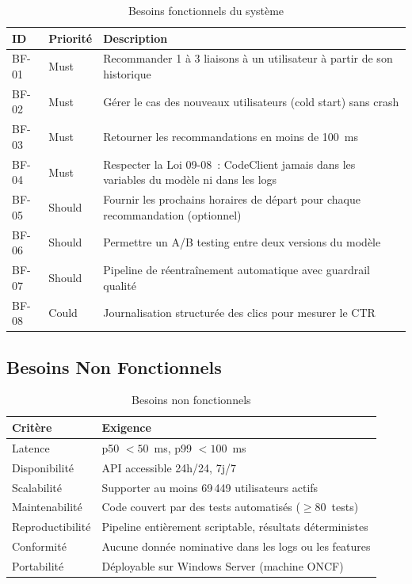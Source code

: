 \documentclass[12pt, a4paper]{report}
\begin{document}
\begin{table}[H]
\centering
\caption{Besoins fonctionnels du système}
\begin{tabularx}{\textwidth}{|l|l|X|}
\hline
\textbf{ID} & \textbf{Priorité} & \textbf{Description} \\
\hline
BF-01 & Must & Recommander 1 à 3 liaisons à un utilisateur à partir de son historique \\
\hline
BF-02 & Must & Gérer le cas des nouveaux utilisateurs (cold start) sans crash \\
\hline
BF-03 & Must & Retourner les recommandations en moins de 100~ms \\
\hline
BF-04 & Must & Respecter la Loi 09-08~: CodeClient jamais dans les variables du modèle ni dans les logs \\
\hline
BF-05 & Should & Fournir les prochains horaires de départ pour chaque recommandation (optionnel) \\
\hline
BF-06 & Should & Permettre un A/B testing entre deux versions du modèle \\
\hline
BF-07 & Should & Pipeline de réentraînement automatique avec guardrail qualité \\
\hline
BF-08 & Could & Journalisation structurée des clics pour mesurer le CTR \\
\hline
\end{tabularx}
\end{table}

\subsection{Besoins Non Fonctionnels}

\begin{table}[H]
\centering
\caption{Besoins non fonctionnels}
\begin{tabularx}{\textwidth}{|l|X|}
\hline
\textbf{Critère} & \textbf{Exigence} \\
\hline
Latence    & p50 $< 50$~ms, p99 $< 100$~ms \\
\hline
Disponibilité & API accessible 24h/24, 7j/7 \\
\hline
Scalabilité & Supporter au moins 69\,449 utilisateurs actifs \\
\hline
Maintenabilité & Code couvert par des tests automatisés ($\geq 80$~tests) \\
\hline
Reproductibilité & Pipeline entièrement scriptable, résultats déterministes \\
\hline
Conformité & Aucune donnée nominative dans les logs ou les features \\
\hline
Portabilité & Déployable sur Windows Server (machine ONCF) \\
\hline
\end{tabularx}
\end{table}
\end{document}
